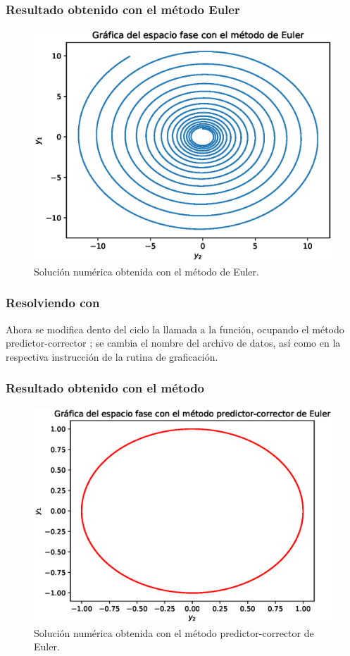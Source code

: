 \begin{frame}
\frametitle{Resultado obtenido con el método Euler}
\begin{figure}[h!]
    \centering
    \includegraphics[scale=0.5]{Imagenes/solucion_edo2_Euler_01.eps}
    \caption{Solución numérica obtenida con el método de Euler.}
    \label{fig:figura_12_02}
\end{figure}
\end{frame}
\begin{frame}
\frametitle{Resolviendo con }
Ahora se modifica dento del ciclo  la llamada a la función, ocupando el método predictor-corrector ; se cambia el nombre del archivo de datos, así como en la respectiva instrucción de la rutina de graficación.
\end{frame}
\begin{frame}
\frametitle{Resultado obtenido con el método }
\begin{figure}[h!]
    \centering
    \includegraphics[scale=0.5]{Imagenes/solucion_edo2_Euler_02.eps}
    \caption{Solución numérica obtenida con el método predictor-corrector de Euler.}
    \label{fig:figura_12_03}
\end{figure}
\end{frame}
